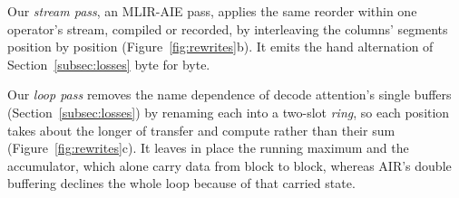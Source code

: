 Our \emph{stream pass}, an MLIR-AIE pass, applies the same reorder within one operator's stream, compiled or recorded, by interleaving the columns' segments position by position (Figure~\ref{fig:rewrites}b).
It emits the hand alternation of Section~\ref{subsec:losses} byte for byte.

Our \emph{loop pass} removes the name dependence of decode attention's single buffers (Section~\ref{subsec:losses}) by renaming each into a two-slot \emph{ring}, so each position takes about the longer of transfer and compute rather than their sum (Figure~\ref{fig:rewrites}c).
It leaves in place the running maximum and the accumulator, which alone carry data from block to block, whereas AIR's double buffering declines the whole loop because of that carried state.

